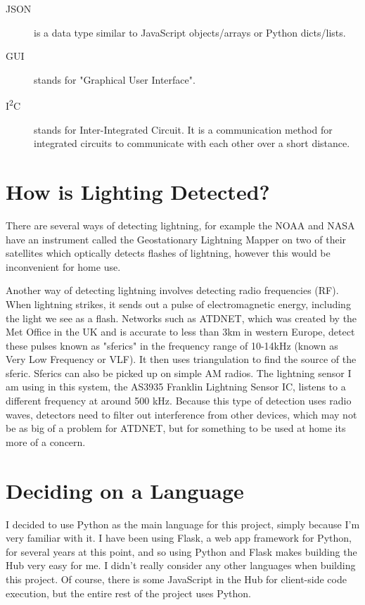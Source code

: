 \documentclass{report}
\begin{document}
\begin{description}
		\item[JSON] is a data type similar to JavaScript objects/arrays or Python dicts/lists.
		
		\item[GUI] stands for "Graphical User Interface". 
		
		\item[I\textsuperscript{2}C] stands for Inter-Integrated Circuit. It is a communication method for integrated circuits to communicate with each other over a short distance.
	\end{description}
	
	\section{How is Lighting Detected?}
	There are several ways of detecting lightning, for example the NOAA and NASA have an instrument called the Geostationary Lightning Mapper on two of their satellites which optically detects flashes of lightning, \cite{noaa} however this would be inconvenient for home use. 
	
	Another way of detecting lightning involves detecting radio frequencies (RF). When lightning strikes, it sends out a pulse of electromagnetic energy, including the light we see as a flash\cite{met}. Networks such as ATDNET, which was created by the Met Office in the UK and is accurate to less than 3km in western Europe, detect these pulses known as "sferics" in the frequency range of 10-14kHz (known as Very Low Frequency or VLF). It then uses triangulation to find the source of the sferic\cite{met}. Sferics can also be picked up on simple AM radios. The lightning sensor I am using in this system, the AS3935 Franklin Lightning Sensor IC, listens to a different frequency at around 500 kHz. \cite{as3935datasheet} Because this type of detection uses radio waves, detectors need to filter out interference from other devices, which may not be as big of a problem for ATDNET, but for something to be used at home its more of a concern.
	
	\section{Deciding on a Language}
	I decided to use Python as the main language for this project, simply because I'm very familiar with it. I have been using Flask, a web app framework for Python, for several years at this point, and so using Python and Flask makes building the Hub very easy for me. I didn't really consider any other languages when building this project. Of course, there is some JavaScript in the Hub for client-side code execution, but the entire rest of the project uses Python.
	
\end{document}
